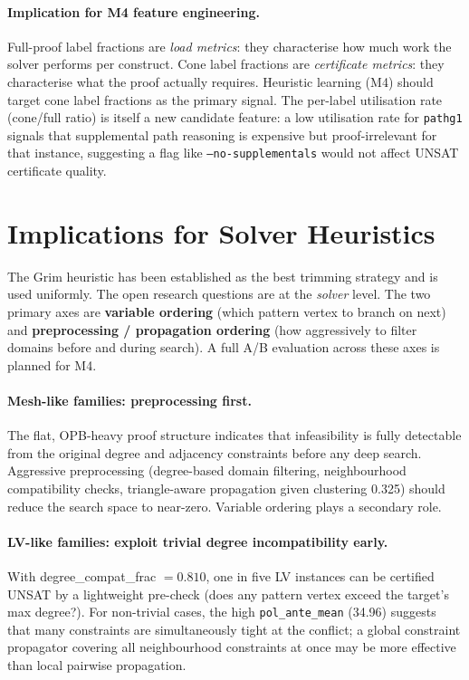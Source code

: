 \documentclass[11pt,a4paper]{article}
\begin{document}
\paragraph{Implication for M4 feature engineering.}
Full-proof label fractions are \emph{load metrics}: they characterise how much work the solver
performs per construct.
Cone label fractions are \emph{certificate metrics}: they characterise what the proof actually
requires.
Heuristic learning (M4) should target cone label fractions as the primary signal.
The per-label utilisation rate (cone/full ratio) is itself a new candidate feature:
a low utilisation rate for \texttt{pathg1} signals that supplemental path reasoning is expensive
but proof-irrelevant for that instance, suggesting a flag like \texttt{--no-supplementals} would
not affect UNSAT certificate quality.

\section{Implications for Solver Heuristics}
\label{sec:solver-heuristics}

The Grim heuristic has been established as the best trimming strategy and is used uniformly.
The open research questions are at the \emph{solver} level.
The two primary axes are \textbf{variable ordering} (which pattern vertex to branch on next)
and \textbf{preprocessing / propagation ordering} (how aggressively to filter domains before
and during search).
A full A/B evaluation across these axes is planned for M4.

\paragraph{Mesh-like families: preprocessing first.}
The flat, OPB-heavy proof structure indicates that infeasibility is fully detectable from the
original degree and adjacency constraints before any deep search.
Aggressive preprocessing (degree-based domain filtering, neighbourhood compatibility checks,
triangle-aware propagation given clustering 0.325) should reduce the search space to near-zero.
Variable ordering plays a secondary role.

\paragraph{LV-like families: exploit trivial degree incompatibility early.}
With degree\_compat\_frac $= 0.810$, one in five LV instances can be certified UNSAT by a
lightweight pre-check (does any pattern vertex exceed the target's max degree?).
For non-trivial cases, the high \texttt{pol\_ante\_mean} (34.96) suggests that many constraints
are simultaneously tight at the conflict; a global constraint propagator covering all
neighbourhood constraints at once may be more effective than local pairwise propagation.
\end{document}
